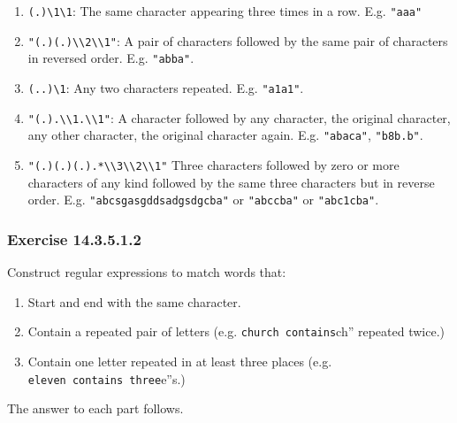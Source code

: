 \documentclass[]{book}
\providecommand{\tightlist}{%
  \setlength{\itemsep}{0pt}\setlength{\parskip}{0pt}}
\theoremstyle{plain}
\theoremstyle{remark}
\begin{document}
\begin{enumerate}
\def\labelenumi{\arabic{enumi}.}
\tightlist
\item
  \texttt{(.)\textbackslash{}1\textbackslash{}1}: The same character
  appearing three times in a row. E.g. \texttt{"aaa"}
\item
  \texttt{"(.)(.)\textbackslash{}\textbackslash{}2\textbackslash{}\textbackslash{}1"}:
  A pair of characters followed by the same pair of characters in
  reversed order. E.g. \texttt{"abba"}.
\item
  \texttt{(..)\textbackslash{}1}: Any two characters repeated. E.g.
  \texttt{"a1a1"}.
\item
  \texttt{"(.).\textbackslash{}\textbackslash{}1.\textbackslash{}\textbackslash{}1"}:
  A character followed by any character, the original character, any
  other character, the original character again. E.g. \texttt{"abaca"},
  \texttt{"b8b.b"}.
\item
  \texttt{"(.)(.)(.).*\textbackslash{}\textbackslash{}3\textbackslash{}\textbackslash{}2\textbackslash{}\textbackslash{}1"}
  Three characters followed by zero or more characters of any kind
  followed by the same three characters but in reverse order. E.g.
  \texttt{"abcsgasgddsadgsdgcba"} or \texttt{"abccba"} or
  \texttt{"abc1cba"}.
\end{enumerate}

\hypertarget{exercise-14.3.5.1.2}{%
\subsubsection*{\texorpdfstring{Exercise
{14.3.5.1.2}}{Exercise 14.3.5.1.2}}\label{exercise-14.3.5.1.2}}

Construct regular expressions to match words that:

\begin{enumerate}
\def\labelenumi{\arabic{enumi}.}
\tightlist
\item
  Start and end with the same character.
\item
  Contain a repeated pair of letters (e.g.
  \texttt{church\textquotesingle{}\textquotesingle{}\ contains}ch''
  repeated twice.)
\item
  Contain one letter repeated in at least three places (e.g.
  \texttt{eleven\textquotesingle{}\textquotesingle{}\ contains\ three}e''s.)
\end{enumerate}

The answer to each part follows.
\end{document}
